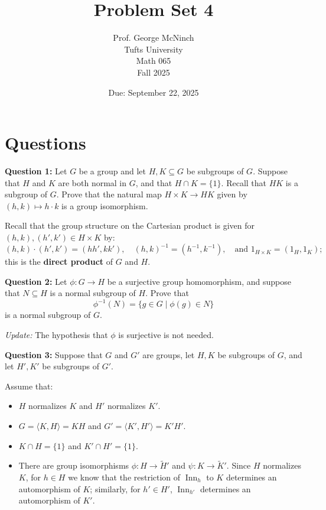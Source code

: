 \documentclass{article}
\title{Problem Set 4}
\author{Prof. George McNinch \\ Tufts University \\ Math 065 \\ Fall 2025}
\date{Due: September 22, 2025}
\newcommand{\Inn}{\operatorname{Inn}}
\begin{document}
\maketitle

\section*{Questions}

\textbf{Question 1:} Let $G$ be a group and let $H, K \subseteq G$ be subgroups of $G$. Suppose that $H$ and $K$ are both normal in $G$, and that $H \cap K = \{1\}$. Recall that $HK$ is a subgroup of $G$. Prove that the natural map $H \times K \to HK$ given by $(h,k) \mapsto h \cdot k$ is a group isomorphism.

Recall that the group structure on the Cartesian product is given for $(h,k), (h',k') \in H \times K$ by: 
$$(h,k) \cdot (h',k') = (hh', kk'), \quad (h,k)^{-1} = (h^{-1},k^{-1}), \quad \text{and } 1_{H \times K} = (1_H,1_K);$$
this is the \textbf{direct product} of $G$ and $H$.

\vspace{5mm}

\textbf{Question 2:} Let $\phi: G \to H$ be a surjective group homomorphism, and suppose that $N \subseteq H$ is a normal subgroup of $H$. Prove that 
$$\phi^{-1}(N) = \{g \in G \mid \phi(g) \in N\}$$
is a normal subgroup of $G$.

\textit{Update:} The hypothesis that $\phi$ is surjective is not needed.

\vspace{5mm}

\textbf{Question 3:} Suppose that $G$ and $G'$ are groups, let $H, K$ be subgroups of $G$, and let $H', K'$ be subgroups of $G'$.

Assume that:
\begin{itemize}
    \item $H$ normalizes $K$ and $H'$ normalizes $K'$.
    \item $G = \langle K, H \rangle = KH$ and $G' = \langle K', H' \rangle = K'H'$.
    \item $K \cap H = \{1\}$ and $K' \cap H' = \{1\}$.
    \item There are group isomorphisms $\phi: H \to \tilde{H}'$ and $\psi: K \to \tilde{K}'$. Since $H$ normalizes $K$, for $h \in H$ we know that the restriction of $\Inn_h$ to $K$ determines an automorphism of $K$; similarly, for $h' \in H'$, $\Inn_{h'}$ determines an automorphism of $K'$.
\end{itemize}
\end{document}
